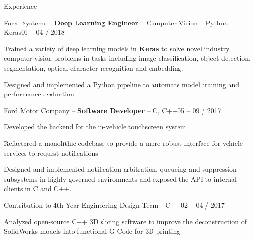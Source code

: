 \documentclass{resume} %
\begin{document}
\begin{rSection}{Experience}
\begin{rSubsection}{\large Focal Systems \small -- \textbf{Deep Learning Engineer} \normalfont -- Computer Vision -- Python, Keras}{01 -- 04 / 2018}{}{}
\item Trained a variety of deep learning models in \textbf{Keras} to solve novel industry computer vision problems in tasks including image classification, object detection, segmentation, optical character recognition and embedding.
		\item Designed and implemented a Python pipeline to automate model training and performance evaluation.
\end{rSubsection}

\begin{rSubsection}{\large Ford Motor Company \small -- \textbf{Software Developer} \normalfont -- C, C++}{05 -- 09 / 2017}{}{}

\item Developed the backend for the in-vehicle touchscreen system. 
\item Refactored a monolithic codebase to provide a more robust interface for vehicle services to request notifications
\item Designed and implemented notification arbitration, queueing and suppression subsystems in highly governed environments and exposed the API to internal clients in C and C++.

\end{rSubsection}

\begin{rSubsection}{Contribution to 4th-Year Engineering Design Team \normalfont - C++}{02 -- 04 / 2017}{}{}
\item Analyzed open-source C++ 3D slicing software to improve the deconstruction of SolidWorks models into functional G-Code for 3D printing
\end{rSubsection}

\end{rSection}
\end{document}
